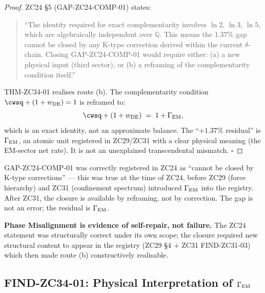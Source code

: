 \documentclass[12pt, a4paper]{article}
\begin{document}
\begin{proof}
ZC24 \S 5 (GAP-ZC24-COMP-01) states:
\begin{quote}\small
``The identity required for exact complementarity involves
$\ln 2$, $\ln 3$, $\ln 5$, which are algebraically independent
over $\mathbb{Q}$. This means the $1.37\%$ gap cannot be closed
by any K-type correction derived within the current
$\delta$-chain. Closing GAP-ZC24-COMP-01 would require either:
(a) a new physical input (third sector), or
(b) a reframing of the complementarity condition itself.''
\end{quote}
THM-ZC34-01 realises route (b). The complementarity condition
$\cwsq + (1+w_{\rm DE}) = 1$ is reframed to:
\[
  \cwsq + (1+w_{\rm DE}) \;=\; 1 + \Gamma_{\rm EM},
\]
which is an exact identity, not an approximate balance. The
``$+1.37\%$ residual'' is $\Gamma_{\rm EM}$, an atomic unit
registered in ZC29/ZC31 with a clear physical meaning (the
EM-sector net rate). It is not an unexplained transcendental
mismatch.
\hfill$\square$
\end{proof}

\begin{keybox}[title={The Failure-Stance reading}]
GAP-ZC24-COMP-01 was correctly registered in ZC24 as
``cannot be closed by K-type corrections'' --- this was true
at the time of ZC24, before ZC29 (force hierarchy) and ZC31
(confinement spectrum) introduced $\Gamma_{\rm EM}$ into the
registry. After ZC31, the closure is available by reframing,
not by correction. The gap is not an error; the residual is
$\Gamma_{\rm EM}$.

\medskip
\textbf{Phase Misalignment is evidence of self-repair, not
failure.} The ZC24 statement was structurally correct under
its own scope; the closure required new structural content
to appear in the registry (ZC29 \S 4 + ZC31 FIND-ZC31-03)
which then made route (b) constructively realisable.
\end{keybox}

\subsection{FIND-ZC34-01: Physical Interpretation of $\Gamma_{\rm EM}$}
\label{sec:find-01}
\end{document}
